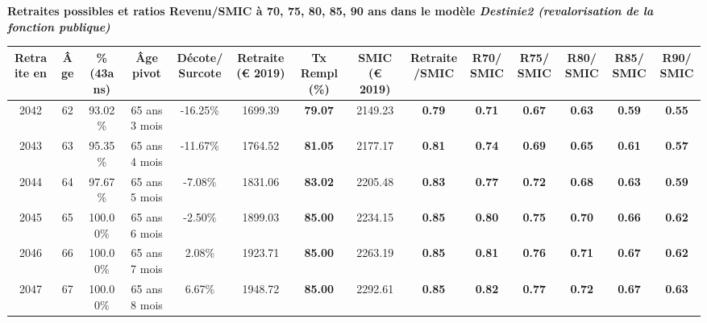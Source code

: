  \vspace{0.1cm} 
{\bf \noindent Retraites possibles et ratios Revenu/SMIC à 70, 75, 80, 85, 90 ans dans le modèle \emph{Destinie2 (revalorisation de la fonction publique)}}  
 
\begin{adjustbox}{max width=\textwidth} 
\begin{tabular}[htb]{|c|c||c|c|c||c|c||c|c||c|c|c|c|c|} 
\hline 
 Retraite en &  Âge &  \%(43ans) &  Âge pivot &  Décote/Surcote &  Retraite (\euro{} 2019) &  Tx Rempl(\%) &  SMIC (\euro{} 2019) &  Retraite/SMIC &  R70/SMIC &  R75/SMIC &  R80/SMIC &  R85/SMIC &  R90/SMIC \\ 
\hline \hline 
 2042 &  62 &  93.02\% &  65 ans 3 mois &  -16.25\% &  1699.39 &  {\bf 79.07} &  2149.23 &  {\bf {\color{red} 0.79}} &  {\bf {\color{red} 0.71}} &  {\bf {\color{red} 0.67}} &  {\bf {\color{red} 0.63}} &  {\bf {\color{red} 0.59}} &  {\bf {\color{red} 0.55}} \\ 
\hline 
 2043 &  63 &  95.35\% &  65 ans 4 mois &  -11.67\% &  1764.52 &  {\bf 81.05} &  2177.17 &  {\bf {\color{red} 0.81}} &  {\bf {\color{red} 0.74}} &  {\bf {\color{red} 0.69}} &  {\bf {\color{red} 0.65}} &  {\bf {\color{red} 0.61}} &  {\bf {\color{red} 0.57}} \\ 
\hline 
 2044 &  64 &  97.67\% &  65 ans 5 mois &  -7.08\% &  1831.06 &  {\bf 83.02} &  2205.48 &  {\bf {\color{red} 0.83}} &  {\bf {\color{red} 0.77}} &  {\bf {\color{red} 0.72}} &  {\bf {\color{red} 0.68}} &  {\bf {\color{red} 0.63}} &  {\bf {\color{red} 0.59}} \\ 
\hline 
 2045 &  65 &  100.00\% &  65 ans 6 mois &  -2.50\% &  1899.03 &  {\bf 85.00} &  2234.15 &  {\bf {\color{red} 0.85}} &  {\bf {\color{red} 0.80}} &  {\bf {\color{red} 0.75}} &  {\bf {\color{red} 0.70}} &  {\bf {\color{red} 0.66}} &  {\bf {\color{red} 0.62}} \\ 
\hline 
 2046 &  66 &  100.00\% &  65 ans 7 mois &  2.08\% &  1923.71 &  {\bf 85.00} &  2263.19 &  {\bf {\color{red} 0.85}} &  {\bf {\color{red} 0.81}} &  {\bf {\color{red} 0.76}} &  {\bf {\color{red} 0.71}} &  {\bf {\color{red} 0.67}} &  {\bf {\color{red} 0.62}} \\ 
\hline 
 2047 &  67 &  100.00\% &  65 ans 8 mois &  6.67\% &  1948.72 &  {\bf 85.00} &  2292.61 &  {\bf {\color{red} 0.85}} &  {\bf {\color{red} 0.82}} &  {\bf {\color{red} 0.77}} &  {\bf {\color{red} 0.72}} &  {\bf {\color{red} 0.67}} &  {\bf {\color{red} 0.63}} \\ 
\hline 
\hline 
\end{tabular} 
\end{adjustbox} 
 
